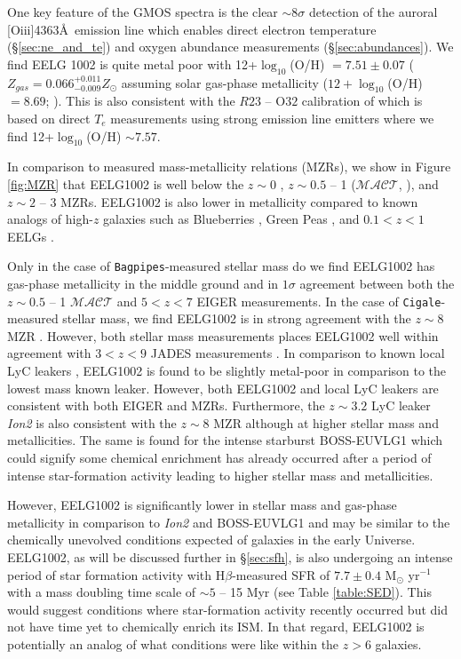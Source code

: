 \documentclass[twocolumn,tight,times,linenumbers]{aastex631}
\newcommand{\hbeta}{H$\beta$}
\newcommand{\oiii}{[O{\sc iii}]}
\newcommand{\cigale}{\texttt{Cigale}}
\newcommand{\bagpipes}{\texttt{Bagpipes}}
\begin{document}
	
		One key feature of the GMOS spectra is the clear $\sim 8\sigma$ detection of the auroral \oiii4363\AA~emission line which enables direct electron temperature (\S\ref{sec:ne_and_te}) and oxygen abundance measurements (\S\ref{sec:abundances}). We find EELG 1002 is quite metal poor with  12+$\log_{10}$(O/H) $ = 7.51\pm0.07$ ($Z_{gas} = 0.066^{+0.011}_{-0.009} Z_\odot$ assuming solar gas-phase metallicity ($12+\log_{10}$(O/H)$ = 8.69$; \citealt{Asplund2021}). This is also consistent with the $R23$ -- O$32$ calibration of \cite{Jiang2019} which is based on direct $T_e$ measurements using strong emission line emitters where we find 12+$\log_{10}$(O/H) $ \sim 7.57$. 
  
        In comparison to measured mass-metallicity relations (MZRs), we show in Figure \ref{fig:MZR} that EELG1002 is well below the $z \sim 0$ \citep{Andrews2013}, $z \sim 0.5$ -- 1 ($\mathcal{MACT}$, \citealt{Ly2016}), and $z \sim 2$ -- 3 \citep{Sanders2021} MZRs. EELG1002 is also lower in metallicity compared to known analogs of high-$z$ galaxies such as Blueberries \citep{Yang2017_BB}, Green Peas \citep{Yang2017_GP}, and $0.1 < z < 1$ EELGs \citep{Amorin2015}.
		
		Only in the case of \bagpipes-measured stellar mass do we find EELG1002 has gas-phase metallicity in the middle ground and in $1\sigma$ agreement between both the $z \sim 0.5$ -- 1 $\mathcal{MACT}$ and $5 < z < 7$ EIGER measurements. In the case of \cigale-measured stellar mass, we find EELG1002 is in strong agreement with the $z\sim8$ MZR \citep{Langeroodi2023}. However, both stellar mass measurements places EELG1002 well within agreement with $3 < z < 9$ JADES measurements \citep{Boyett2024}. In comparison to known local LyC leakers \citep{Izotov2016,Izotov2018}, EELG1002 is found to be slightly metal-poor in comparison to the lowest mass known leaker. However, both EELG1002 and local LyC leakers are consistent with both EIGER and \citet{Langeroodi2023} MZRs. Furthermore, the $z \sim 3.2$ LyC leaker \textit{Ion2} is also consistent with the $z \sim 8$ MZR although at higher stellar mass and metallicities. The same is found for the intense starburst BOSS-EUVLG1 \citep{Marques-Chaves2020} which could signify some chemical enrichment has already occurred after a period of intense star-formation activity leading to higher stellar mass and metallicities.
		
		However, EELG1002 is significantly lower in stellar mass and gas-phase metallicity in comparison to \textit{Ion2} and BOSS-EUVLG1 and may be similar to the chemically unevolved conditions expected of galaxies in the early Universe. EELG1002, as will be discussed further in \S\ref{sec:sfh}, is also undergoing an intense period of star formation activity with \hbeta-measured SFR of $7.7\pm0.4$ M$_\odot$ yr$^{-1}$ with a mass doubling time scale of $\sim 5$ -- 15 Myr (see Table \ref{table:SED}). This would suggest conditions where star-formation activity recently occurred but did not have time yet to chemically enrich its ISM. In that regard, EELG1002 is potentially an analog of what conditions were like within the $z > 6$ galaxies.
\end{document}
